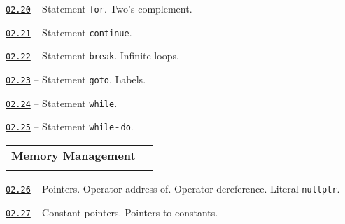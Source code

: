 \documentclass[a4paper,12pt]{article}
\renewenvironment{itemize}
{
    \begin{list}{\labelitemi}
    {
      \setlength{\topsep}{0pt}
      \setlength{\partopsep}{0pt}
      \setlength{\parskip}{0pt}
      \setlength{\itemsep}{0pt}
      \setlength{\parsep}{0pt}
      \setlength{\leftmargin}{14.5pt}
    }
}{\end{list}}
\begin{document}
\begin{itemize}

    \item \href{https://github.com/i-s-m-mipt/Education/blob/master/projects/examples/source/02.20.cpp}{\texttt{02.20}} -- Statement \lstinline{for}. Two's complement.

    \smallskip

    \item \href{https://github.com/i-s-m-mipt/Education/blob/master/projects/examples/source/02.21.cpp}{\texttt{02.21}} -- Statement \lstinline{continue}.

    \smallskip

    \item \href{https://github.com/i-s-m-mipt/Education/blob/master/projects/examples/source/02.22.cpp}{\texttt{02.22}} -- Statement \lstinline{break}. Infinite loops.

    \smallskip

    \item \href{https://github.com/i-s-m-mipt/Education/blob/master/projects/examples/source/02.23.cpp}{\texttt{02.23}} -- Statement \lstinline{goto}. Labels.

    \smallskip

    \item \href{https://github.com/i-s-m-mipt/Education/blob/master/projects/examples/source/02.24.cpp}{\texttt{02.24}} -- Statement \lstinline{while}.

    \smallskip

    \item \href{https://github.com/i-s-m-mipt/Education/blob/master/projects/examples/source/02.25.cpp}{\texttt{02.25}} -- Statement \lstinline{while}\,-\,\lstinline{do}.

\end{itemize}

\bigskip\medskip

\begin{tabular}{!{\vrule width 1pt}L{4.4cm}!{\vrule width 1pt}L{14.6cm}!{\vrule width 0pt}} 


\textbf{Memory Management} & \\


\end{tabular}

\medskip\smallskip

\begin{itemize}

    \item \href{https://github.com/i-s-m-mipt/Education/blob/master/projects/examples/source/02.26.cpp}{\texttt{02.26}} -- Pointers. Operator address of. Operator dereference. Literal \lstinline{nullptr}.

    \smallskip

    \item \href{https://github.com/i-s-m-mipt/Education/blob/master/projects/examples/source/02.27.cpp}{\texttt{02.27}} -- Constant pointers. Pointers to constants.

\end{itemize}
\end{document}
